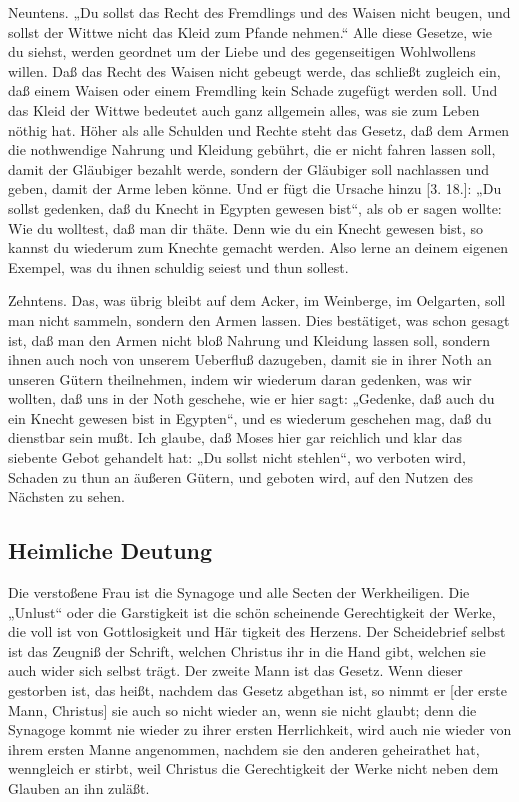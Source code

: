Neuntens. „Du sollst das Recht des Fremdlings und des Waisen nicht beugen, und sollst der Wittwe nicht das Kleid zum Pfande nehmen.“ Alle diese Gesetze, wie du siehst, werden geordnet um der Liebe und des gegenseitigen Wohlwollens willen. Daß das Recht des Waisen nicht gebeugt werde, das schließt zugleich ein, daß einem Waisen oder einem Fremdling kein Schade zugefügt werden soll. Und das Kleid der Wittwe bedeutet auch ganz allgemein alles, was sie zum Leben nöthig hat. Höher als alle Schulden und Rechte steht das Gesetz, daß dem Armen die nothwendige Nahrung und Kleidung gebührt, die er nicht fahren lassen soll, damit der Gläubiger bezahlt werde, sondern der Gläubiger soll nachlassen und geben, damit der Arme leben könne. Und er fügt die Ursache hinzu [3. 18.]: „Du sollst gedenken, daß du Knecht in Egypten gewesen bist“, als ob er sagen wollte: Wie du wolltest, daß man
dir thäte. Denn wie du ein Knecht gewesen bist, so kannst du wiederum zum Knechte gemacht werden. Also lerne an deinem eigenen Exempel, was du ihnen schuldig seiest und thun sollest.

Zehntens. Das, was übrig bleibt auf dem Acker, im Weinberge, im Oelgarten, soll man nicht sammeln, sondern den Armen lassen. Dies bestätiget, was schon gesagt ist, daß man den Armen nicht bloß Nahrung und Kleidung lassen soll, sondern ihnen auch noch von unserem Ueberfluß dazugeben, damit sie in ihrer Noth an unseren Gütern theilnehmen, indem wir wiederum daran gedenken, was wir wollten, daß uns in der Noth geschehe, wie er hier sagt: „Gedenke, daß auch du ein Knecht gewesen bist in Egypten“, und es wiederum geschehen mag, daß du dienstbar sein mußt. Ich glaube, daß Moses hier gar reichlich und klar das siebente Gebot gehandelt hat: „Du sollst nicht stehlen“, wo verboten wird, Schaden zu thun an äußeren Gütern, und geboten wird, auf den Nutzen des Nächsten zu sehen.

\subsection{Heimliche Deutung}

Die verstoßene Frau ist die Synagoge und alle Secten der Werkheiligen. Die „Unlust“ oder die Garstigkeit ist die schön scheinende Gerechtigkeit der Werke, die voll ist von Gottlosigkeit und Här tigkeit des Herzens. Der Scheidebrief selbst ist das Zeugniß der Schrift, welchen Christus ihr in die Hand gibt, welchen sie auch wider sich selbst trägt. Der zweite Mann ist das Gesetz. Wenn dieser gestorben ist, das heißt, nachdem das Gesetz abgethan ist, so nimmt er [der erste Mann, Christus] sie auch so nicht wieder an, wenn sie nicht glaubt; denn die Synagoge kommt nie wieder zu ihrer ersten Herrlichkeit, wird auch nie wieder von ihrem ersten Manne angenommen, nachdem sie den anderen geheirathet hat, wenngleich er stirbt, weil Christus die Gerechtigkeit der Werke nicht neben dem Glauben an ihn zuläßt.

